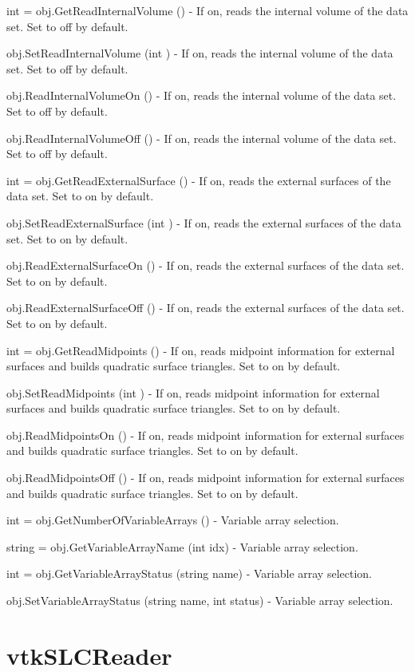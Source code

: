 \begin{DoxyItemize}
\item {\ttfamily int = obj.\-Get\-Read\-Internal\-Volume ()} -\/ If on, reads the internal volume of the data set. Set to off by default.  
\item {\ttfamily obj.\-Set\-Read\-Internal\-Volume (int )} -\/ If on, reads the internal volume of the data set. Set to off by default.  
\item {\ttfamily obj.\-Read\-Internal\-Volume\-On ()} -\/ If on, reads the internal volume of the data set. Set to off by default.  
\item {\ttfamily obj.\-Read\-Internal\-Volume\-Off ()} -\/ If on, reads the internal volume of the data set. Set to off by default.  
\item {\ttfamily int = obj.\-Get\-Read\-External\-Surface ()} -\/ If on, reads the external surfaces of the data set. Set to on by default.  
\item {\ttfamily obj.\-Set\-Read\-External\-Surface (int )} -\/ If on, reads the external surfaces of the data set. Set to on by default.  
\item {\ttfamily obj.\-Read\-External\-Surface\-On ()} -\/ If on, reads the external surfaces of the data set. Set to on by default.  
\item {\ttfamily obj.\-Read\-External\-Surface\-Off ()} -\/ If on, reads the external surfaces of the data set. Set to on by default.  
\item {\ttfamily int = obj.\-Get\-Read\-Midpoints ()} -\/ If on, reads midpoint information for external surfaces and builds quadratic surface triangles. Set to on by default.  
\item {\ttfamily obj.\-Set\-Read\-Midpoints (int )} -\/ If on, reads midpoint information for external surfaces and builds quadratic surface triangles. Set to on by default.  
\item {\ttfamily obj.\-Read\-Midpoints\-On ()} -\/ If on, reads midpoint information for external surfaces and builds quadratic surface triangles. Set to on by default.  
\item {\ttfamily obj.\-Read\-Midpoints\-Off ()} -\/ If on, reads midpoint information for external surfaces and builds quadratic surface triangles. Set to on by default.  
\item {\ttfamily int = obj.\-Get\-Number\-Of\-Variable\-Arrays ()} -\/ Variable array selection.  
\item {\ttfamily string = obj.\-Get\-Variable\-Array\-Name (int idx)} -\/ Variable array selection.  
\item {\ttfamily int = obj.\-Get\-Variable\-Array\-Status (string name)} -\/ Variable array selection.  
\item {\ttfamily obj.\-Set\-Variable\-Array\-Status (string name, int status)} -\/ Variable array selection.  
\end{DoxyItemize}\hypertarget{vtkio_vtkslcreader}{}\section{vtk\-S\-L\-C\-Reader}\label{vtkio_vtkslcreader}
